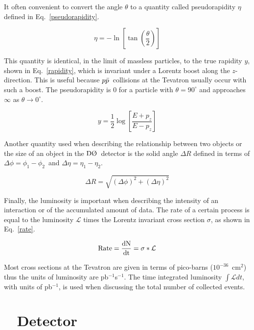 It often convenient to convert the angle $\theta$ to a quantity called pseudorapidity $\eta$ defined in Eq.~\ref{pseudorapidity}.

\begin{equation}
\label{pseudorapidity}
\eta = -\ln \left[ \tan \left( \frac{\theta}{2} \right) \right]
\end{equation}

This quantity is identical, in the limit of massless particles, to the true rapidity $y$, shown in Eq.~\ref{rapidity}, which is invariant under a Lorentz boost along the $z$-direction. This is useful because $\mbox{$p\bar{p}$}$~collisions at the Tevatron usually occur with such a boost. The pseudorapidity is $0$ for a particle with $\theta = 90^{\circ}$ and approaches $\infty$ as $\theta \rightarrow 0^{\circ}$.

\begin{equation}
\label{rapidity}
y = \frac{1}{2}\log \left[ \frac{E + p_{z}}{E - p_{z}} \right]
\end{equation}

Another quantity used when describing the relationship between two objects or the size of an object in the $\dzero$~detector is the solid angle $\Delta R$ defined in terms of $\Delta\phi=\phi_{1} - \phi_{2}$~and $\Delta\eta=\eta_{1} - \eta_{2}$.

\begin{equation}
\Delta R = \sqrt{(\Delta\phi)^{2} + (\Delta\eta)^{2}}
\end{equation}

Finally, the luminosity is important when describing the intensity of an interaction or of the accumulated amount of data. The rate of a certain process is equal to the luminosity $\mathcal{L}$ times the Lorentz invariant cross section $\sigma$, as shown in Eq.~\ref{rate}.

\begin{equation}
\label{rate}
\rm{Rate} = \frac{dN}{dt} = \sigma * \mathcal{L}
\end{equation}

Most cross sections at the Tevatron are given in terms of pico-barns ($10^{-36}$~cm$^{2}$) thus the units of luminosity are pb$^{-1}$s$^{-1}$. The time integrated luminosity $\int \mathcal{L} dt$, with units of pb$^{-1}$, is used when discussing the total number of collected events.

\section{\dzero~ Detector}
\label{detector}


